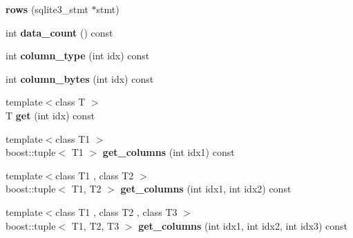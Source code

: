 \begin{DoxyCompactItemize}
\item 
\hypertarget{classsqlite3pp_1_1query_1_1rows_a0e1a157e8839291cde7ead8ea243b882}{{\bfseries rows} (sqlite3\-\_\-stmt $\ast$stmt)}\label{classsqlite3pp_1_1query_1_1rows_a0e1a157e8839291cde7ead8ea243b882}

\item 
\hypertarget{classsqlite3pp_1_1query_1_1rows_a8564cf19c09033fb3244b91b0d320768}{int {\bfseries data\-\_\-count} () const }\label{classsqlite3pp_1_1query_1_1rows_a8564cf19c09033fb3244b91b0d320768}

\item 
\hypertarget{classsqlite3pp_1_1query_1_1rows_abd3bd9f1f490ad38b5adef4f84135201}{int {\bfseries column\-\_\-type} (int idx) const }\label{classsqlite3pp_1_1query_1_1rows_abd3bd9f1f490ad38b5adef4f84135201}

\item 
\hypertarget{classsqlite3pp_1_1query_1_1rows_a17881e50948d6c16941ddab08f2479f7}{int {\bfseries column\-\_\-bytes} (int idx) const }\label{classsqlite3pp_1_1query_1_1rows_a17881e50948d6c16941ddab08f2479f7}

\item 
\hypertarget{classsqlite3pp_1_1query_1_1rows_af25a44d5d184d65cf2a6a8f60069acb9}{{\footnotesize template$<$class T $>$ }\\T {\bfseries get} (int idx) const }\label{classsqlite3pp_1_1query_1_1rows_af25a44d5d184d65cf2a6a8f60069acb9}

\item 
\hypertarget{classsqlite3pp_1_1query_1_1rows_a40739dfe3bc4622629bbd5efbcd4a039}{{\footnotesize template$<$class T1 $>$ }\\boost\-::tuple$<$ T1 $>$ {\bfseries get\-\_\-columns} (int idx1) const }\label{classsqlite3pp_1_1query_1_1rows_a40739dfe3bc4622629bbd5efbcd4a039}

\item 
\hypertarget{classsqlite3pp_1_1query_1_1rows_a0db39c837c4089eb16a4149f271ecab3}{{\footnotesize template$<$class T1 , class T2 $>$ }\\boost\-::tuple$<$ T1, T2 $>$ {\bfseries get\-\_\-columns} (int idx1, int idx2) const }\label{classsqlite3pp_1_1query_1_1rows_a0db39c837c4089eb16a4149f271ecab3}

\item 
\hypertarget{classsqlite3pp_1_1query_1_1rows_a10758ebf6d4711ca3cdbc2d10cdfc079}{{\footnotesize template$<$class T1 , class T2 , class T3 $>$ }\\boost\-::tuple$<$ T1, T2, T3 $>$ {\bfseries get\-\_\-columns} (int idx1, int idx2, int idx3) const }\label{classsqlite3pp_1_1query_1_1rows_a10758ebf6d4711ca3cdbc2d10cdfc079}


\end{DoxyCompactItemize}
